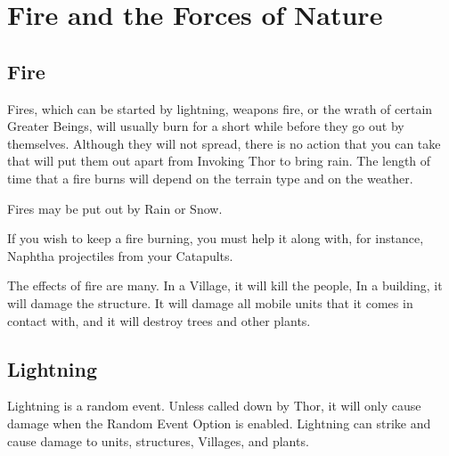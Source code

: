 
\chapter{Fire and the Forces of Nature}

\section{Fire}


Fires, which can be started by lightning, weapons fire, or the wrath of certain Greater Beings, will usually burn for a short while before they go out by themselves. Although they will not spread, there is no action that you can take that will put them out apart from Invoking Thor to bring rain. The length of time that a fire burns will depend on the terrain type and on the weather.

Fires may be put out by Rain or Snow.

If you wish to keep a fire burning, you must help it along with, for instance, Naphtha projectiles from your Catapults.

The effects of fire are many. In a Village, it will kill the people, In a building, it will damage the structure. It will damage all mobile units that it comes in contact with, and it will destroy trees and other plants.

\section{Lightning}


Lightning is a random event. Unless called down by Thor, it will only cause damage when the Random Event Option is enabled. Lightning can strike and cause damage to units, structures, Villages, and plants.

